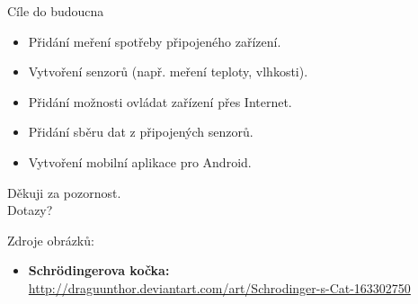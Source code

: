 \documentclass[11pt]{beamer}
\begin{document}
\begin{frame}{Cíle do budoucna}
  \begin{itemize}
    \item Přidání meření spotřeby připojeného zařízení.
    \item Vytvoření senzorů (např. meření teploty, vlhkosti).
    \item Přidání možnosti ovládat zařízení přes Internet.
    \item Přidání sběru dat z připojených senzorů.
    \item Vytvoření mobilní aplikace pro Android.
  \end{itemize}
\end{frame}

\begin{frame}
  \begin{center}
    \huge{Děkuji za pozornost.} \\[8mm]
    \large{Dotazy?}
  \end{center}
  \vspace{32mm}
  Zdroje obrázků:
  \begin{itemize}
    \item[] \hspace{-5mm} \tiny{\textbf{Schrödingerova kočka:} \url{http://draguunthor.deviantart.com/art/Schrodinger-s-Cat-163302750}}
  \end{itemize}
\end{frame}
\end{document}
